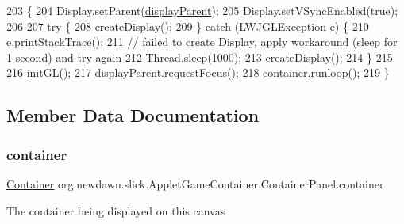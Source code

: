 \begin{DoxyCode}
203                                            \{
204          Display.setParent(\mbox{\hyperlink{classorg_1_1newdawn_1_1slick_1_1_applet_game_container_a62b5a90dcfc53b23717ea63133f86332}{displayParent}});
205          Display.setVSyncEnabled(\textcolor{keyword}{true});
206          
207          \textcolor{keywordflow}{try} \{
208             \mbox{\hyperlink{classorg_1_1newdawn_1_1slick_1_1_applet_game_container_1_1_container_panel_a4b7aa4a0a37d31b1391e1d254fe0e693}{createDisplay}}();
209          \} \textcolor{keywordflow}{catch} (LWJGLException e) \{
210             e.printStackTrace();
211             \textcolor{comment}{// failed to create Display, apply workaround (sleep for 1 second) and try again}
212             Thread.sleep(1000);
213             \mbox{\hyperlink{classorg_1_1newdawn_1_1slick_1_1_applet_game_container_1_1_container_panel_a4b7aa4a0a37d31b1391e1d254fe0e693}{createDisplay}}();
214          \}
215          
216          \mbox{\hyperlink{classorg_1_1newdawn_1_1slick_1_1_applet_game_container_1_1_container_panel_a4b658282611744354185e5adef954b53}{initGL}}();
217          \mbox{\hyperlink{classorg_1_1newdawn_1_1slick_1_1_applet_game_container_a62b5a90dcfc53b23717ea63133f86332}{displayParent}}.requestFocus();
218          \mbox{\hyperlink{classorg_1_1newdawn_1_1slick_1_1_applet_game_container_1_1_container_panel_a205433c30651024b8b0ba19894a080f6}{container}}.\mbox{\hyperlink{classorg_1_1newdawn_1_1slick_1_1_applet_game_container_1_1_container_a5ca9c4fe320f0593d6794d13ddc7490a}{runloop}}();
219       \}
\end{DoxyCode}


\subsection{Member Data Documentation}
\mbox{\label{classorg_1_1newdawn_1_1slick_1_1_applet_game_container_1_1_container_panel_a205433c30651024b8b0ba19894a080f6}} 
\subsubsection{\texorpdfstring{container}{container}}
{\footnotesize\ttfamily \mbox{\hyperlink{classorg_1_1newdawn_1_1slick_1_1_applet_game_container_1_1_container}{Container}} org.\+newdawn.\+slick.\+Applet\+Game\+Container.\+Container\+Panel.\+container\hspace{0.3cm}{\ttfamily [private]}}

The container being displayed on this canvas 